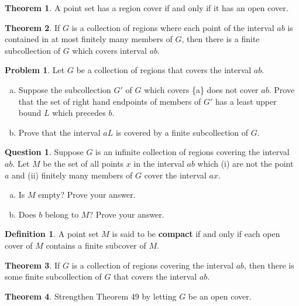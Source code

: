 \documentclass{article}
\theoremstyle{definition}
\newtheorem{definition}{Definition}
\newtheorem{question}{Question}
\newtheorem{theorem}{Theorem}
\theoremstyle{definition}
\newtheorem{problem}{Problem}
\theoremstyle{plain}
\begin{document}
\begin{theorem}
  A point set has a region cover if and only if it has an open cover.
\end{theorem}

\begin{theorem}
  If $G$ is a collection of regions where each point of the interval $ab$ is
  contained in at most finitely many members of $G$, then there is a finite
  subcollection of $G$ which covers interval $ab$.
\end{theorem}

\begin{problem}
  Let $G$ be a collection of regions that covers the interval $ab$.
  \begin{enumerate}[a.]
    \item Suppose the subcollection $G'$ of $G$ which covers \{a\} does not
      cover $ab$.  Prove that the set of right hand endpoints of members of
      $G'$ has a least upper bound $L$ which precedes $b$.
    \item Prove that the interval $aL$ is covered by a finite subcollection of
      $G$.
  \end{enumerate}
\end{problem}

\begin{question}
  Suppose $G$ is an infinite collection of regions covering the interval $ab$.
  Let $M$ be the set of all points $x$ in the interval $ab$ which (i) are not
  the point $a$ and (ii) finitely many members of $G$ cover the interval $ax$.
  \begin{enumerate}[a.]
    \item Is $M$ empty?  Prove your answer.
    \item Does $b$ belong to $M$? Prove your answer.
  \end{enumerate}
\end{question}

\begin{definition}
  A point set $M$ is said to be \textbf{compact} if and only if each open cover
  of $M$ contains a finite subcover of $M$.
\end{definition}

\begin{theorem}
  If $G$ is a collection of regions covering the interval $ab$, then there is
  some finite subcollection of $G$ that covers the interval $ab$.
\end{theorem}

\begin{theorem}
  Strengthen Theorem 49 by letting $G$ be an open cover.
\end{theorem}
\end{document}
